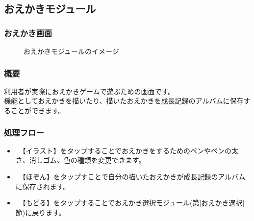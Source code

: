 \documentclass[a4j]{jarticle}
\begin{document}
\newpage
\subsection{おえかきモジュール}
\subsubsection{おえかき画面\label{おえかき}}
\begin{figure}[H]
    \begin{center}
    \caption {おえかきモジュールのイメージ}
    \label{functionselection}
    \end{center}
\end{figure}

\subsubsection*{概要}
 利用者が実際におえかきゲームで遊ぶための画面です。\\
機能としておえかきを描いたり、描いたおえかきを成長記録のアルバムに保存することができます。
\subsubsection*{処理フロー}
\begin{itemize}
\item　【イラスト】をタップすることでおえかきをするためのペンやペンの太さ、消しゴム、色の種類を変更できます。
\item　【ほぞん】をタップすことで自分の描いたおえかきが成長記録のアルバムに保存されます。
\item　【もどる】をタップすることでおえかき選択モジュール(第\ref{おえかき選択}節)に戻ります。
\end{itemize}
\end{document}
